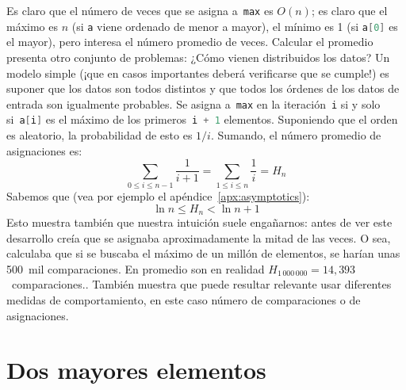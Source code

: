   Es claro que el número de veces
  que se asigna a~\lstinline[language = C]!max!
  es \(O(n)\);
  es claro que el máximo es \(n\)
  (si \lstinline[language = C]!a! viene ordenado de menor a mayor),
  el mínimo es \num{1}
  (si \lstinline[language = C]!a[0]! es el mayor),
  pero interesa el número promedio de veces.
  Calcular el promedio presenta otro conjunto de problemas:
  ¿Cómo vienen distribuidos los datos?
  Un modelo simple
  (¡que en casos importantes deberá verificarse que se cumple!)
  es suponer que los datos son todos distintos
  y que todos los órdenes de los datos de entrada
  son igualmente probables.
  Se asigna a~\lstinline[language = C]!max!
  en la iteración~\lstinline[language = C]!i!
  si y solo si~\lstinline[language = C]!a[i]!
  es el máximo de los primeros~\lstinline[language = C]!i + 1! elementos.
  Suponiendo que el orden es aleatorio,
  la probabilidad de esto es \(1 / i\).
  Sumando,
  el número promedio de asignaciones es:
  \begin{equation*}
    \sum_{0 \le i \le n - 1} \frac{1}{i + 1}
      = \sum_{1 \le i \le n} \frac{1}{i}
      = H_n
  \end{equation*}
  Sabemos que
  (vea por ejemplo el apéndice~\ref{apx:asymptotics}):
  \begin{equation*}
    \ln n \le H_n < \ln n + 1
  \end{equation*}
  Esto muestra también que nuestra intuición suele engañarnos:
  antes de ver este desarrollo
  creía que se asignaba aproximadamente la mitad de las veces.
  O sea,
  calculaba que si se buscaba el máximo de un millón de elementos,
  se harían unas 500~mil comparaciones.
  En promedio son en realidad \(H_{1\,000\,000} = 14,393\)~comparaciones..
  También muestra que puede resultar relevante
  usar diferentes medidas de comportamiento,
  en este caso número de comparaciones o de asignaciones.

\section{Dos mayores elementos}
\label{sec:dos-mayores}

